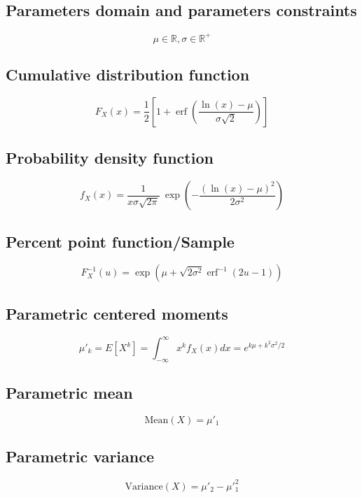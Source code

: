 \documentclass{article}
\begin{document}
\subsection{Parameters domain and parameters constraints}
\begin{equation*} \mu\in\mathbb{R}, \sigma\in\mathbb{R}^{+} \end{equation*}
\subsection{Cumulative distribution function}
\begin{equation*} F_{X}\left(x\right)=\frac{1}{2}\left[1+\operatorname{erf}\left(\frac{\ln (x)-\mu}{\sigma\sqrt{2}}\right)\right] \end{equation*}
\subsection{Probability density function}
\begin{equation*} f_{X}\left(x\right)=\frac 1 {x\sigma\sqrt{2\pi}}\ \exp\left(-\frac{\left(\ln\left(x\right) -\mu\right)^2}{2\sigma^2}\right) \end{equation*}
\subsection{Percent point function/Sample}
\begin{equation*} F^{-1}_{X}\left(u\right)=\exp(\mu+\sqrt{2\sigma^2}\operatorname{erf}^{-1}(2u-1)) \end{equation*}
\subsection{Parametric centered moments}
\begin{equation*} \mu'_{k}=E[X^k]=\int_{-\infty}^{\infty}x^{k}f_{X}\left(x\right)dx=e^{k\mu+k^2\sigma^2/2} \end{equation*}
\subsection{Parametric mean}
\begin{equation*} \mathrm{Mean}(X)=\mu'_{1} \end{equation*}
\subsection{Parametric variance}
\begin{equation*} \mathrm{Variance}(X)=\mu'_{2}-\mu'^{2}_{1} \end{equation*}
\end{document}
